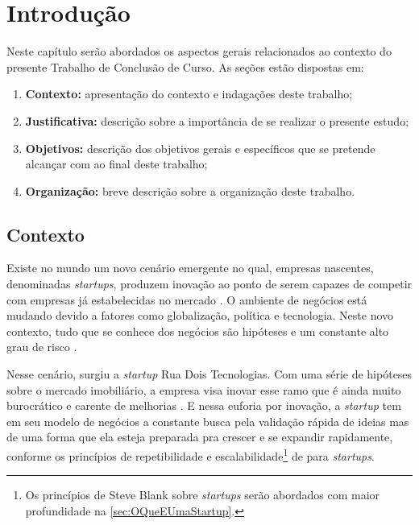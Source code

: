 \chapter[Introdução]{Introdução}

Neste capítulo serão abordados os aspectos gerais relacionados ao contexto
do presente Trabalho de Conclusão de Curso. As seções estão dispostas em:

  \begin{enumerate}
    \item \textbf{Contexto:} apresentação do contexto e indagações deste
    trabalho;
    \item \textbf{Justificativa:} descrição sobre a importância de se
    realizar o presente estudo;
    \item \textbf{Objetivos:} descrição dos objetivos gerais e específicos
    que se pretende alcançar com ao final deste trabalho;
    \item \textbf{Organização:} breve descrição sobre a organização deste
    trabalho.
  \end{enumerate}

\section{Contexto}

Existe no mundo um novo cenário emergente no qual, empresas nascentes,
denominadas \textit{startups}, produzem inovação ao ponto de serem capazes
de competir com empresas já estabelecidas no mercado \cite{CapacidadeDeInovacao}.
O ambiente de negócios está mudando devido a fatores como globalização, política
e tecnologia. Neste novo contexto, tudo que se conhece dos negócios são
hipóteses e um constante alto grau de risco \cite{Akiyoshi}.

Nesse cenário, surgiu a \textit{startup} Rua Dois Tecnologias. Com uma série
de hipóteses sobre o mercado imobiliário, a empresa visa inovar esse ramo que
é ainda muito burocrático e carente de melhorias \cite{LouisaXu}. E nessa
euforia por inovação, a \textit{startup} tem em seu modelo de negócios a
constante busca pela validação rápida de ideias mas de uma forma que ela
esteja preparada pra crescer e se expandir rapidamente, conforme os princípios
de repetibilidade e escalabilidade\footnote{Os princípios de Steve Blank sobre
\textit{startups} serão abordados com maior profundidade na 
\autoref{sec:OQueEUmaStartup}.} de  para
\textit{startups}.

